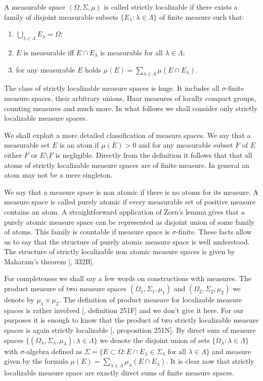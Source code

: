 A measurable space $(\Omega,\Sigma,\mu)$ is called strictly localizable if there
exists a  family of disjoint measurable subsets 
$ \{E_\lambda:\lambda\in\Lambda \}$ of finite measure such that: 
\begin{enumerate}[label = (\roman*)]
  \item $\bigcup_{\lambda\in\Lambda}E_\lambda=\Omega$;

  \item $E$ is measurable iff $E\cap E_\lambda$ is measurable for all
  $\lambda\in\Lambda$;

  \item for any measurable $E$ holds 
  $\mu(E)=\sum_{\lambda\in\Lambda}\mu(E\cap E_\lambda)$. 
\end{enumerate}
  
The class of strictly localizable measure spaces is huge. It includes all
$\sigma$-finite measure spaces, their arbitrary unions, Haar measures of
locally compact groups, counting measures and much more. In what follows we
shall consider only strictly localizable measure spaces.

We shall exploit a more detailed classification of measure spaces. We say that a
measurable set $E$ is an atom if $\mu(E)>0$ and for any measurable subset $F$ of
$E$ either $F$ or $E\setminus F$ is negligible. Directly from the definition it
follows that that all atoms of strictly localizable measure spaces are of finite
measure. In general an atom may not be a mere singleton.

We say that a measure space is non atomic if there is no atoms for its measure.
A measure space is called purely atomic if every measurable set of positive
measure contains an atom. A straightforward application of Zorn's lemma gives
that a purely atomic measure space can be represented as disjoint union of some
family of atoms. This family is countable if measure space is $\sigma$-finite.
These facts allow us to say that the structure of purely atomic measure space is
well understood. The structure of strictly localizable non atomic measure spaces
is given by Maharam's theorem [\cite{FremMeasTh}, 332B]. 

For completeness we shall say a few words on constructions with measures. The
product measure of two measure spaces $(\Omega_1,\Sigma_1,\mu_1)$ and
$(\Omega_2,\Sigma_2,\mu_2)$ we denote by $\mu_1\times \mu_2$. The definition of
product measure for localizable measure spaces is rather involved
[\cite{FremMeasTh}, definition 251F] and we don't give it here.  For our
purposes it is enough to know that the product of two strictly localizable
measure spaces is again strictly localizable [\cite{FremMeasTh}, proposition
251N]. By direct sum of measure spaces $ \{(\Omega_\lambda, \Sigma_\lambda,
\mu_\lambda):\lambda\in\Lambda \}$ we denote the disjoint union of sets 
$\{\Omega_\lambda:\lambda\in\Lambda \}$ with $\sigma$-algebra defined as 
$\Sigma= \{
  E\subset \Omega: E\cap E_\lambda\in\Sigma_\lambda
  \mbox{ for all }\lambda\in\Lambda
 \}$ 
and measure given by the formula 
$\mu(E)=\sum_{\lambda\in\Lambda}\mu_\lambda(E\cap E_\lambda)$. It is clear now
that strictly localizable measure space are exactly direct sums of finite
measure spaces.

